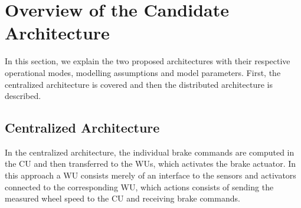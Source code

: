 
\newpage
\section{Overview of the Candidate Architecture}
\label{S2}

In this section, we explain the two proposed architectures with their respective operational modes, modelling assumptions and model parameters. First, the centralized architecture is covered and then the distributed architecture is described. 


\subsection{Centralized Architecture}
In the centralized architecture, the individual brake commands are computed in the CU and then transferred to the WUs, which activates the brake actuator. In this approach a WU consists merely of an interface to the sensors and activators connected to the corresponding WU, which actions consists of sending the measured wheel speed to the CU and receiving brake commands. 
